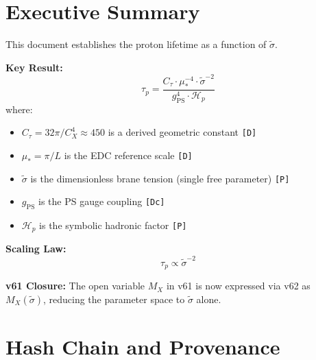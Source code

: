 \documentclass[11pt,a4paper]{article}
\newcommand{\tagD}{\textcolor{green!50!black}{\texttt{[D]}}}
\newcommand{\tagDc}{\textcolor{blue!70!black}{\texttt{[Dc]}}}
\newcommand{\tagP}{\textcolor{orange!80!black}{\texttt{[P]}}}
\theoremstyle{definition}
\begin{document}
\tableofcontents
\newpage

\section{Executive Summary}
\label{sec:executive}


\begin{canonbox}
This document establishes the proton lifetime as a function of $\tilde{\sigma}$.

\textbf{Key Result:}
\begin{equation}
\label{eq:taup-summary}
\boxed{\tau_p = \frac{C_\tau \cdot \mu_*^{-4} \cdot \tilde{\sigma}^{-2}}{g_{\text{PS}}^4 \cdot \mathcal{H}_p}}
\end{equation}
where:
\begin{itemize}
  \item $C_\tau = 32\pi / C_X^4 \approx 450$ is a derived geometric constant \tagD{}
  \item $\mu_* = \pi/L$ is the EDC reference scale \tagD{}
  \item $\tilde{\sigma}$ is the dimensionless brane tension (single free parameter) \tagP{}
  \item $g_{\text{PS}}$ is the PS gauge coupling \tagDc{}
  \item $\mathcal{H}_p$ is the symbolic hadronic factor \tagP{}
\end{itemize}

\textbf{Scaling Law:}
\begin{equation}
\label{eq:scaling-summary}
\boxed{\tau_p \propto \tilde{\sigma}^{-2}}
\end{equation}

\textbf{v61 Closure:} The open variable $M_X$ in v61 is now expressed via v62 as
$M_X(\tilde{\sigma})$, reducing the parameter space to $\tilde{\sigma}$ alone.
\end{canonbox}

\section{Hash Chain and Provenance}
\label{sec:hashchain}
\end{document}
